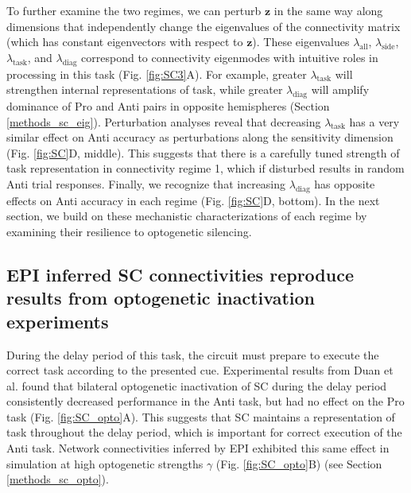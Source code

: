 \documentclass[11pt]{article}
\begin{document}
To further examine the two regimes, we can perturb $\mathbf{z}$ in the same way along dimensions that independently change the eigenvalues of the connectivity matrix (which has constant eigenvectors with respect to $\mathbf{z}$).  These eigenvalues $\lambda_{\text{all}}$, $\lambda_{\text{side}}$, $\lambda_{\text{task}}$, and $\lambda_{\text{diag}}$ correspond to connectivity eigenmodes with intuitive roles in processing in this task (Fig. \ref{fig:SC3}A).
For example, greater $\lambda_{\text{task}}$ will strengthen internal representations of task, while greater $\lambda_{\text{diag}}$ will amplify dominance of Pro and Anti pairs in opposite hemispheres (Section \ref{methods_sc_eig}).
Perturbation analyses reveal that decreasing $\lambda_{\text{task}}$ has a very similar effect on Anti accuracy as perturbations along the sensitivity dimension (Fig. \ref{fig:SC}D, middle).
This suggests that there is a carefully tuned strength of task representation in connectivity regime 1, which if disturbed results in random Anti trial responses.
Finally, we recognize that increasing $\lambda_{\text{diag}}$ has opposite effects on Anti accuracy in each regime (Fig. \ref{fig:SC}D, bottom).
In the next section, we build on these mechanistic characterizations of each regime by examining their resilience to optogenetic silencing.

\subsection{EPI inferred SC connectivities reproduce results from optogenetic inactivation experiments} \label{results_SC_opt}

During the delay period of this task, the circuit must prepare to execute the correct task according to the presented cue.
Experimental results from Duan et al. found that bilateral optogenetic inactivation of SC during the delay period consistently decreased performance in the Anti task, but had no effect on the Pro task (Fig. \ref{fig:SC_opto}A).
This suggests that SC maintains a representation of task throughout the delay period, which is important for correct execution of the Anti task.
Network connectivities inferred by EPI exhibited this same effect in simulation at high optogenetic strengths $\gamma$ (Fig. \ref{fig:SC_opto}B) (see Section \ref{methods_sc_opto}).
\end{document}
